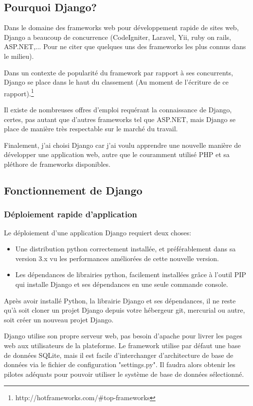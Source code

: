 \documentclass[12pt,table,a4paper]{report}
\begin{document}
\subsection{Pourquoi Django?}

Dans le domaine des frameworks web pour développement rapide de sites web, Django a beaucoup de concurrence (CodeIgniter, Laravel, Yii, ruby on rails, ASP.NET,... Pour ne citer que quelques uns des frameworks les plus connus dans le milieu).

Dans un contexte de popularité du framework par rapport à ses concurrents, Django se place dans le haut du classement (Au moment de l'écriture de ce rapport).\footnote{http://hotframeworks.com/\#top-frameworks}

Il existe de nombreuses offres d'emploi requérant la connaissance de Django, certes, pas autant que d'autres frameworks tel que ASP.NET, mais Django se place de manière très respectable sur le marché du travail.

Finalement, j'ai choisi Django car j'ai voulu apprendre une nouvelle manière de développer une application web, autre que le couramment utilisé PHP et sa pléthore de frameworks disponibles.

\subsection{Fonctionnement de Django}
\subsubsection{Déploiement rapide d'application}
Le déploiement d'une application Django requiert deux choses:

\begin{itemize}
	\item{Une distribution python correctement installée, et préférablement dans sa version 3.x vu les performances améliorées de cette nouvelle version.}
	\item{Les dépendances de librairies python, facilement installées grâce à l'outil PIP qui installe Django et ses dépendances en une seule commande console.}
\end{itemize}

Après avoir installé Python, la librairie Django et ses dépendances, il ne reste qu'à soit cloner un projet Django depuis votre hébergeur git, mercurial ou autre, soit créer un nouveau projet Django.

Django utilise son propre serveur web, pas besoin d'apache pour livrer les pages web aux utilisateurs de la plateforme. Le framework utilise par défaut une base de données SQLite, mais il est facile d'interchanger d'architecture de base de données via le fichier de configuration "settings.py". Il faudra alors obtenir les pilotes adéquats pour pouvoir utiliser le système de base de données sélectionné.
\end{document}
